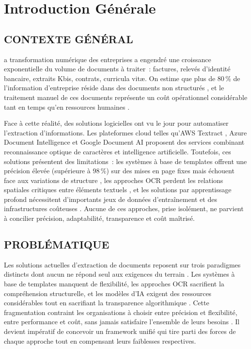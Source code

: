 %
%
\chapter*{Introduction Générale}


\section*{\color{darkgray}CONTEXTE GÉNÉRAL}
a transformation numérique des entreprises a engendré une croissance exponentielle du volume de documents à traiter~: factures, relevés d'identité bancaire, extraits Kbis, contrats, curricula vitæ. On estime que plus de 80\,\% de l'information d'entreprise réside dans des documents non structurés \cite{aiim2019}, et le traitement manuel de ces documents représente un coût opérationnel considérable tant en temps qu'en ressources humaines \cite{palm2017}.

Face à cette réalité, des solutions logicielles ont vu le jour pour automatiser l'extraction d'informations. Les plateformes cloud telles qu'AWS Textract \cite{aws2024textract}, Azure Document Intelligence \cite{microsoft2024azure} et Google Document AI \cite{google2024documentai} proposent des services combinant reconnaissance optique de caractères et intelligence artificielle. Toutefois, ces solutions présentent des limitations~: les systèmes à base de templates offrent une précision élevée (supérieure à 98\,\%) sur des mises en page fixes mais échouent face aux variations de structure \cite{schuster2013}, les approches OCR perdent les relations spatiales critiques entre éléments textuels \cite{smith2007tesseract}, et les solutions par apprentissage profond nécessitent d'importants jeux de données d'entraînement et des infrastructures coûteuses \cite{xu2020layoutlm}. Aucune de ces approches, prise isolément, ne parvient à concilier précision, adaptabilité, transparence et coût maîtrisé.

\section*{\color{darkgray}PROBLÉMATIQUE}
Les solutions actuelles d'extraction de documents reposent sur trois paradigmes distincts dont aucun ne répond seul aux exigences du terrain \cite{binmakhashen2019}. Les systèmes à base de templates manquent de flexibilité, les approches OCR sacrifient la compréhension structurelle, et les modèles d'IA exigent des ressources considérables tout en sacrifiant la transparence algorithmique \cite{harley2015icdar}. Cette fragmentation contraint les organisations à choisir entre précision et flexibilité, entre performance et coût, sans jamais satisfaire l'ensemble de leurs besoins \cite{dengel2006smartfix}. Il devient impératif de concevoir un framework unifié qui tire parti des forces de chaque approche tout en compensant leurs faiblesses respectives.

